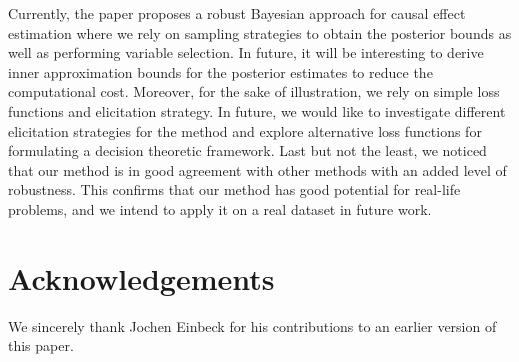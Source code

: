 \documentclass[preprint,12pt]{elsarticle}
\begin{document}
Currently, the paper proposes a robust Bayesian approach for causal effect estimation where
we rely on sampling strategies to obtain the posterior bounds as well as performing 
variable selection. In future, it will be interesting to derive inner approximation bounds
for the posterior estimates to reduce the computational cost. Moreover, for the sake of
illustration, we rely on simple loss functions and elicitation strategy. In future, we would
like to investigate different elicitation strategies for the method and explore alternative 
loss functions for formulating a decision theoretic framework. Last but not the least,
we noticed that our method
is in good agreement with other methods with an added level of robustness.
This confirms that our method has good potential for real-life problems,
and we intend to apply it on a real dataset in future work.

\section*{Acknowledgements}

We sincerely thank Jochen Einbeck for his contributions to an earlier version of this paper.

 

\end{document}
